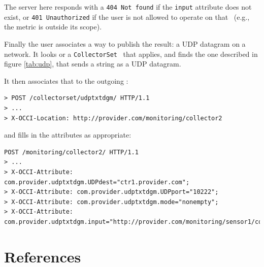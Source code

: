 \documentclass[12pt]{article}  %
\begin{document}
The server here responds with a {\tt 404 Not found} if the {\tt input} attribute does not exist, or {\tt 401 Unauthorized} if the user is not allowed to operate on that \rs\ (e.g., the metric is outside its scope).

Finally the user associates a way to publish the result: a UDP datagram on a network. It looks or a {\tt CollectorSet} \mi\ that applies, and finds the one described in figure \ref{tab:udp}, that sends a string as a UDP datagram.

\begin{table}
\scriptsize
{}

\caption{Attributes defined for the {\tt udptxtdgm} mixin \label{tab:udp}}
\end {table}

It then associates that \mi to the outgoing \coll:

{\scriptsize
\begin{verbatim}
> POST /collectorset/udptxtdgm/ HTTP/1.1
> ...
> X-OCCI-Location: http://provider.com/monitoring/collector2
\end{verbatim}
 }
and fills in the attributes as appropriate:

\begin{verbatim}
POST /monitoring/collector2/ HTTP/1.1
> ...
> X-OCCI-Attribute: com.provider.udptxtdgm.UDPdest="ctr1.provider.com";
> X-OCCI-Attribute: com.provider.udptxtdgm.UDPport="10222";
> X-OCCI-Attribute: com.provider.udptxtdgm.mode="nonempty";
> X-OCCI-Attribute: com.provider.udptxtdgm.input="http://provider.com/monitoring/sensor1/compoutput";
\end{verbatim}




\section{References}
\end{document}
